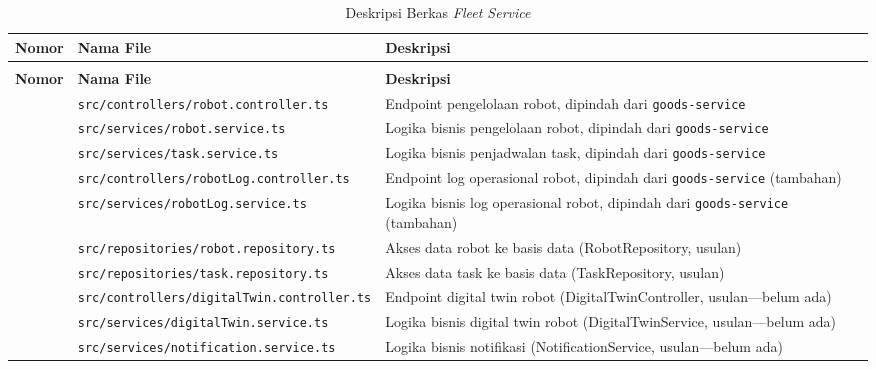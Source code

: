 \begin{xltabular}{\textwidth}{ | >{\raggedright\arraybackslash}p{1.5cm} | >{\raggedright\arraybackslash}p{6.5cm} | >{\raggedright\arraybackslash}X | }
    \caption{Deskripsi Berkas \textit{Fleet Service}} \label{tab:file-fleet} \\
    \hline
    \textbf{Nomor} & \textbf{Nama File} & \textbf{Deskripsi} \\
    \hline
    \endfirsthead
     \\
    \hline
    \textbf{Nomor} & \textbf{Nama File} & \textbf{Deskripsi} \\
    \hline
    \endhead
    \hline
     & \texttt{src/\allowbreak controllers/\allowbreak robot.controller.ts} & Endpoint pengelolaan robot, dipindah dari \texttt{goods-service} \\
     & \texttt{src/\allowbreak services/\allowbreak robot.service.ts} & Logika bisnis pengelolaan robot, dipindah dari \texttt{goods-service} \\
     & \texttt{src/\allowbreak services/\allowbreak task.service.ts} & Logika bisnis penjadwalan task, dipindah dari \texttt{goods-service} \\
     & \texttt{src/\allowbreak controllers/\allowbreak robotLog.controller.ts} & Endpoint log operasional robot, dipindah dari \texttt{goods-service} (tambahan) \\
     & \texttt{src/\allowbreak services/\allowbreak robotLog.service.ts} & Logika bisnis log operasional robot, dipindah dari \texttt{goods-service} (tambahan) \\
     & \texttt{src/\allowbreak repositories/\allowbreak robot.repository.ts} & Akses data robot ke basis data (RobotRepository, usulan) \\
     & \texttt{src/\allowbreak repositories/\allowbreak task.repository.ts} & Akses data task ke basis data (TaskRepository, usulan) \\
     & \texttt{src/\allowbreak controllers/\allowbreak digitalTwin.controller.ts} & Endpoint digital twin robot (DigitalTwinController, usulan---belum ada) \\
     & \texttt{src/\allowbreak services/\allowbreak digitalTwin.service.ts} & Logika bisnis digital twin robot (DigitalTwinService, usulan---belum ada) \\
     & \texttt{src/\allowbreak services/\allowbreak notification.service.ts} & Logika bisnis notifikasi (NotificationService, usulan---belum ada) \\

\end{xltabular}
